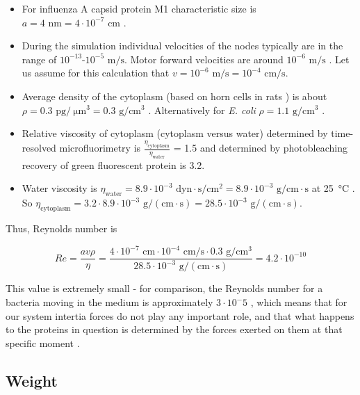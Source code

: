 \begin{itemize}
\item For influenza A capsid protein M1 characteristic size is $a = 4 \text{ nm} = 4 \cdot 10^{-7} \text{ cm}$ \cite{shtykova2013structural}.
\item During the simulation individual velocities of the nodes typically are in the range of $10^{-13}$-$10^{-5} \text{ m/s}$. Motor forward velocities are around $10^{-6} \text{ m/s}$ \cite{muller2008tug}. Let us assume for this calculation that $v = 10^{-6} \text{ m/s} = 10^{-4} \text{ cm/s}$.
\item Average density of the cytoplasm (based on horn cells in rats \cite{hartmann1967cytoplasmic}) is about $\rho = 0.3 \text{ pg}/\SI{}{\micro\meter}^3 = 0.3 \text{ g}/\text{cm}^3$ . Alternatively for \textit{E. coli} $\rho = 1.1 \text{ g}/\text{cm}^3$ \cite{loferer1998determination}.
\item Relative viscosity of cytoplasm (cytoplasm versus water) determined by time-resolved microfluorimetry \cite{swaminathan1997photobleaching} is $\frac{\eta_\text{cytoplasm}}{\eta_\text{water}}$ = 1.5 and determined by photobleaching recovery of green fluorescent protein \cite{swaminathan1997photobleaching} is 3.2.
\item Water viscosity is $\eta_\text{water} = 8.9 \cdot 10^{-3} \text{ dyn} \cdot \text{s}/\text{cm}^2 = 8.9 \cdot 10^{-3} \text{ g}/\text{cm} \cdot \text{s} $ at \SI{25}{\degreeCelsius} \cite{IAPWS2008}. So $\eta_\text{cytoplasm} = 3.2 \cdot 8.9 \cdot 10^{-3} \text{ g}/(\text{cm} \cdot \text{s}) = 28.5 \cdot 10^{-3} \text{ g}/(\text{cm} \cdot \text{s})$.
\end{itemize}

Thus, Reynolds number is

\begin{equation}
Re = \frac{av\rho}{\eta} = \frac{4 \cdot 10^{-7} \text{ cm} \cdot 10^{-4} \text{ cm/s} \cdot 0.3 \text{ g}/\text{cm}^3}{28.5 \cdot 10^{-3} \text{ g}/(\text{cm} \cdot \text{s})} = 4.2 \cdot 10^{-10}
\end{equation}

This value is extremely small - for comparison, the Reynolds number for a bacteria moving in the medium is approximately $3\cdot 10^-5$ \cite{purcell1977life}, which means that for our system intertia forces do not play any important role, and that what happens to the proteins in question is determined by the forces exerted on them at that specific moment \cite{purcell1977life}.

\subsection{Weight}

